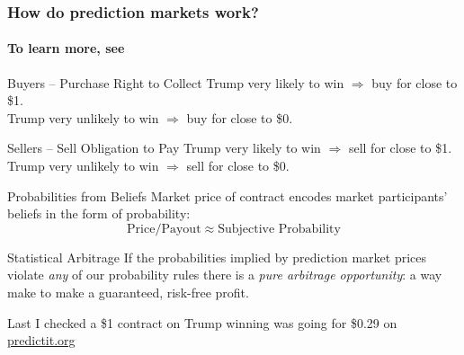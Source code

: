 \documentclass{beamer}
\begin{document}
\begin{frame}

\frametitle{How do prediction markets work?}
\framesubtitle{To learn more, see }
\begin{center}
\vspace{1em}

\begin{block}{Buyers -- Purchase Right to Collect}
Trump very likely to win $\Rightarrow$ buy for close to \$1. \\Trump very unlikely to win $\Rightarrow$ buy for close to \$0.
\end{block}

\begin{block}{Sellers -- Sell Obligation to Pay} 
Trump very likely to win $\Rightarrow$ sell for close to \$1. \\Trump very unlikely to win $\Rightarrow$ sell for close to \$0.
\end{block}
\end{center}

\end{frame}
\begin{frame}

  \begin{block}{Probabilities from Beliefs}
    Market price of contract encodes market participants' beliefs in the form of probability:
$$\mbox{Price}/\mbox{Payout}\approx \mbox{Subjective Probability}$$
  \end{block} \pause

	\begin{alertblock}{Statistical Arbitrage}
    If the probabilities implied by prediction market prices violate \emph{any} of our probability rules there is a \emph{pure arbitrage opportunity}: a way make to make a guaranteed, risk-free profit.
	\end{alertblock} \pause

  \vspace{1em}
  \alert{Last I checked a \$1 contract on Trump winning was going for \$0.29 on \url{predictit.org}}
\end{frame}
\end{document}
